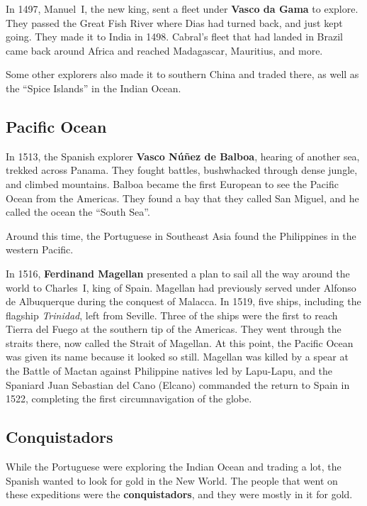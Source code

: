 In 1497, Manuel~I, the new king, sent a fleet under \textbf{Vasco da Gama} to explore.
They passed the Great Fish River where Dias had turned back, and just kept going.
They made it to India in 1498.
Cabral's fleet that had landed in Brazil came back around Africa
and reached Madagascar, Mauritius, and more.

Some other explorers also made it to southern China and traded there,
as well as the ``Spice Islands'' in the Indian Ocean.

\subsection*{Pacific Ocean}

In 1513, the Spanish explorer \textbf{Vasco N\'u\~nez de Balboa},
hearing of another sea, trekked across Panama.
They fought battles, bushwhacked through dense jungle, and climbed mountains.
Balboa became the first European to see the Pacific Ocean from the Americas.
They found a bay that they called San Miguel, and he called the ocean the ``South Sea''.

Around this time, the Portuguese in Southeast Asia found the Philippines in the western Pacific.

In 1516, \textbf{Ferdinand Magellan} presented a plan
to sail all the way around the world to Charles~I, king of Spain.
Magellan had previously served under Alfonso de Albuquerque during the conquest of Malacca.
In 1519, five ships, including the flagship \textit{Trinidad}, left from Seville.
Three of the ships were the first to reach Tierra del Fuego at the southern tip of the Americas.
They went through the straits there, now called the Strait of Magellan.
At this point, the Pacific Ocean was given its name because it looked so still.
Magellan was killed by a spear at the Battle of Mactan against Philippine natives led by Lapu-Lapu,
and the Spaniard Juan Sebastian del Cano (Elcano) commanded the return to Spain in 1522,
completing the first circumnavigation of the globe.

\subsection*{Conquistadors}

While the Portuguese were exploring the Indian Ocean and trading a lot,
the Spanish wanted to look for gold in the New World.
The people that went on these expeditions were the \textbf{conquistadors},
and they were mostly in it for gold.

